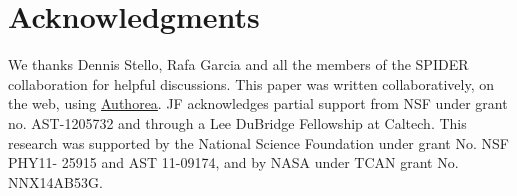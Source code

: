 \section*{Acknowledgments} 
We thanks Dennis Stello, Rafa Garcia and all the members of the SPIDER collaboration for helpful discussions.
This paper was written collaboratively, on the web, using \href{https://www.authorea.com}{Authorea}. JF acknowledges partial support from NSF under grant no. AST-1205732 and through a Lee DuBridge Fellowship at Caltech. This research was supported by the National Science Foundation under grant No. NSF PHY11- 25915 and AST 11-09174, and by NASA under TCAN grant No. NNX14AB53G.

